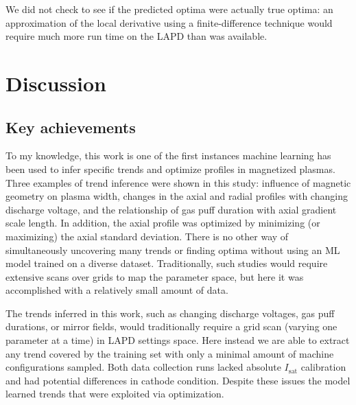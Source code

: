 We did not check to see if the predicted optima were actually true optima: an approximation of the local derivative using a finite-difference technique would require much more run time on the LAPD than was available. 

\section{Discussion}
\label{sec:isat-predict_discussion}

\subsection{Key achievements}

To my knowledge, this work is one of the first instances machine learning has been used to infer specific trends and optimize profiles in magnetized plasmas. Three examples of trend inference were shown in this study: influence of magnetic geometry on plasma width, changes in the axial and radial profiles with changing discharge voltage, and the relationship of gas puff duration with axial gradient scale length. In addition, the axial profile was optimized by minimizing (or maximizing) the axial standard deviation. There is no other way of simultaneously uncovering many trends or finding optima without using an ML model trained on a diverse dataset. Traditionally, such studies would require extensive scans over grids to map the parameter space, but here it was accomplished with a relatively small amount of data.


The trends inferred in this work, such as changing discharge voltages, gas puff durations, or mirror fields, would traditionally require a grid scan (varying one parameter at a time) in LAPD settings space. Here instead we are able to extract any trend covered by the training set with only a minimal amount of machine configurations sampled. Both data collection runs lacked absolute $I_\text{sat}$ calibration and had potential differences in cathode condition. Despite these issues the model learned trends that were exploited via optimization. 

